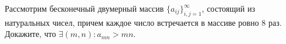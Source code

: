 \documentclass{article}
\begin{document}
Рассмотрим бесконечный двумерный массив $\{a_{ij}\}_{i,j=1}^{\infty}$, состоящий из натуральных чисел, причем каждое число встречается 
в массиве ровно $8$ раз. Докажите, что $\exists (m,n) \colon a_{mn} > mn$.
\end{document}
